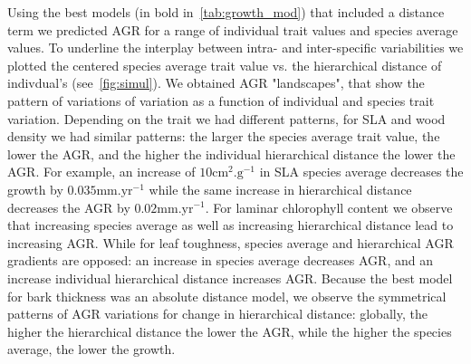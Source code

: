 Using the best models (in bold in~\autoref{tab:growth_mod}) that included a distance term we predicted AGR for a range of individual trait values and species average values. To underline the interplay between intra- and inter-specific variabilities we plotted the centered species average trait value vs. the hierarchical distance of indivdual's (see~\autoref{fig:simul}). We obtained AGR "landscapes", that show the pattern of variations of variation as a function of individual and species trait variation. Depending on the trait we had different patterns, for SLA and wood density we had similar patterns: the larger the species average trait value, the lower the AGR, and the higher the individual hierarchical distance the lower the AGR. For example, an increase of $10\text{cm}^2.\text{g}^{-1}$ in SLA species average decreases the growth by $0.035\text{mm}.\text{yr}^{-1}$ while the same increase in hierarchical distance decreases the AGR by $0.02\text{mm}.\text{yr}^{-1}$. For laminar chlorophyll content we observe that increasing species average as well as increasing hierarchical distance lead to increasing AGR. While for leaf toughness, species average and hierarchical AGR gradients are opposed: an increase in species average decreases AGR, and an increase individual hierarchical distance increases AGR. Because the best model for bark thickness was an absolute distance model, we observe the symmetrical patterns of AGR variations for change in hierarchical distance: globally, the higher the hierarchical distance the lower the AGR, while the higher the species average, the lower the growth.

